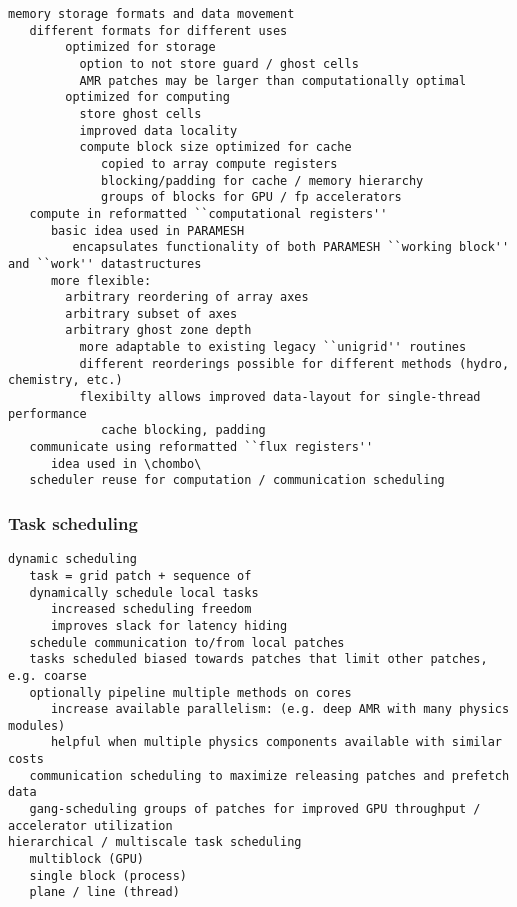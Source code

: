 \documentclass{article}
\begin{document}
\begin{verbatim}
memory storage formats and data movement
   different formats for different uses
        optimized for storage
          option to not store guard / ghost cells
          AMR patches may be larger than computationally optimal
        optimized for computing
          store ghost cells
          improved data locality
          compute block size optimized for cache
             copied to array compute registers
             blocking/padding for cache / memory hierarchy
             groups of blocks for GPU / fp accelerators
   compute in reformatted ``computational registers''
      basic idea used in PARAMESH
         encapsulates functionality of both PARAMESH ``working block'' and ``work'' datastructures
      more flexible:
        arbitrary reordering of array axes
        arbitrary subset of axes
        arbitrary ghost zone depth
          more adaptable to existing legacy ``unigrid'' routines
          different reorderings possible for different methods (hydro, chemistry, etc.)
          flexibilty allows improved data-layout for single-thread performance
             cache blocking, padding
   communicate using reformatted ``flux registers''
      idea used in \chombo\ 
   scheduler reuse for computation / communication scheduling
\end{verbatim}

\subsubsection{Task scheduling} \label{ss:design-scheduling}

\begin{verbatim}
dynamic scheduling
   task = grid patch + sequence of 
   dynamically schedule local tasks
      increased scheduling freedom
      improves slack for latency hiding
   schedule communication to/from local patches
   tasks scheduled biased towards patches that limit other patches, e.g. coarse
   optionally pipeline multiple methods on cores
      increase available parallelism: (e.g. deep AMR with many physics modules)
      helpful when multiple physics components available with similar costs
   communication scheduling to maximize releasing patches and prefetch data
   gang-scheduling groups of patches for improved GPU throughput / accelerator utilization
hierarchical / multiscale task scheduling
   multiblock (GPU)
   single block (process)
   plane / line (thread)
\end{verbatim}
\end{document}

